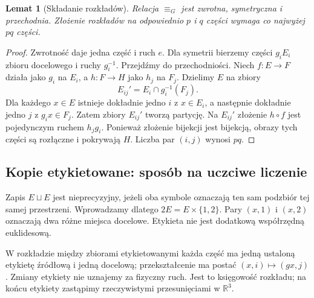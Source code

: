 \documentclass[11pt,a4paper]{article}
\numberwithin{equation}{section}
\theoremstyle{plain}
\newtheorem{lemat}[twierdzenie]{Lemat}
\theoremstyle{definition}
\theoremstyle{remark}
\newcommand{\R}{\mathbb R}
\newcommand{\equivG}{\mathrel{\equiv_G}}
\begin{document}
\begin{lemat}[Składanie rozkładów]\label{lem:skladanie}
Relacja $\equivG$ jest zwrotna, symetryczna i przechodnia. Złożenie rozkładów na odpowiednio $p$ i $q$ części wymaga co najwyżej $pq$ części.
\end{lemat}
\begin{proof}
Zwrotność daje jedna część i ruch $e$. Dla symetrii bierzemy części $g_iE_i$ zbioru docelowego i ruchy $g_i^{-1}$. Przejdźmy do przechodniości. Niech $f:E\to F$ działa jako $g_i$ na $E_i$, a $h:F\to H$ jako $h_j$ na $F_j$. Dzielimy $E$ na zbiory
\begin{equation}\label{eq:3-1}
 E_{ij}'=E_i\cap g_i^{-1}(F_j).
\end{equation}
Dla każdego $x\in E$ istnieje dokładnie jedno $i$ z $x\in E_i$, a następnie dokładnie jedno $j$ z $g_ix\in F_j$. Zatem zbiory $E_{ij}'$ tworzą partycję. Na $E_{ij}'$ złożenie $h\circ f$ jest pojedynczym ruchem $h_jg_i$. Ponieważ złożenie bijekcji jest bijekcją, obrazy tych części są rozłączne i pokrywają $H$. Liczba par $(i,j)$ wynosi $pq$.
\end{proof}

\subsection{Kopie etykietowane: sposób na uczciwe liczenie}
Zapis $E\sqcup E$ jest nieprecyzyjny, jeżeli oba symbole oznaczają ten sam podzbiór tej samej przestrzeni. Wprowadzamy dlatego $2E=E\times\{1,2\}$. Pary $(x,1)$ i $(x,2)$ oznaczają dwa różne miejsca docelowe. Etykieta nie jest dodatkową współrzędną euklidesową.

W rozkładzie między zbiorami etykietowanymi każda część ma jedną ustaloną etykietę źródłową i jedną docelową; przekształcenie ma postać $(x,i)\mapsto(gx,j)$. Zmiany etykiety nie uznajemy za fizyczny ruch. Jest to księgowość rozkładu; na końcu etykiety zastąpimy rzeczywistymi przesunięciami w $\R^3$.
\end{document}

